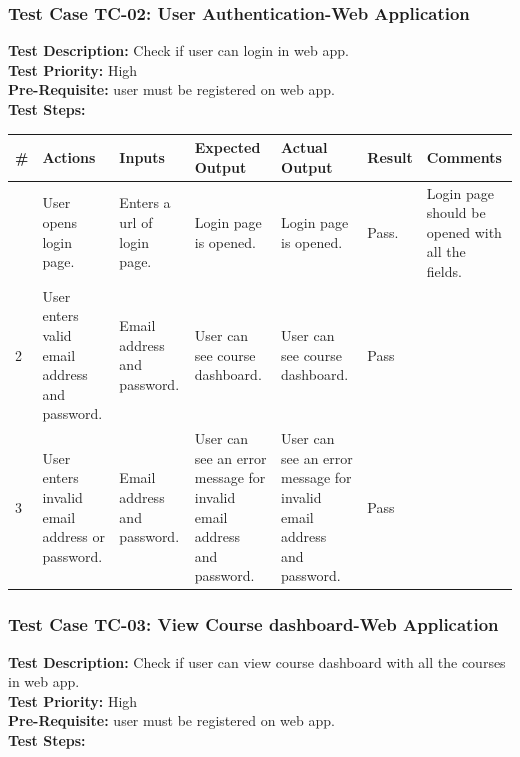 \documentclass[12pt]{article}
\begin{document}
\subsubsection{Test Case TC-02: User Authentication-Web Application}
\textbf{Test Description: } Check if user can login in web app. \\
\textbf{Test Priority: } High \\
\textbf{Pre-Requisite: } user must be registered on web app. \\
\textbf{Test Steps: }
\begin{longtable}{ |>{\raggedright\arraybackslash} p{0.7cm} | >{\raggedright\arraybackslash}p{2cm}|>{\raggedright\arraybackslash} p{2cm} |>{\raggedright\arraybackslash} p{2.5cm} |>{\raggedright\arraybackslash} p{2.5cm} |>{\raggedright\arraybackslash} p{1.3cm} |>{\raggedright\arraybackslash} p{2.5cm} | } 
\hline
\textbf{\#}
& \textbf{Actions} 
& \textbf{Inputs}
& \textbf{Expected Output} 
& \textbf{Actual Output} 
& \textbf{Result} 
& \textbf{Comments} 
\\ 
\hline
1
& User opens login page. 
& Enters a url of login page.
& Login page is opened.
& Login page is opened.
& Pass.
& Login page should be opened with all the fields.
\\ 
\hline

2 
& User enters valid email address and password.
& Email address and password.
& User can see course dashboard.
& User can see course dashboard. 
& Pass
&  
\\ 
\hline


3
& User enters invalid email address or password.
& Email address and password.
& User can see an error message for invalid email address and password.
& User can see an error message for invalid email address and password. 
& Pass
&  
\\ 
\hline

\end{longtable}


\subsubsection{Test Case TC-03: View Course dashboard-Web Application}
\textbf{Test Description: } Check if user can view course dashboard with all the courses in web app. \\
\textbf{Test Priority: } High \\
\textbf{Pre-Requisite: } user must be registered on web app. \\
\textbf{Test Steps: }
\end{document}

